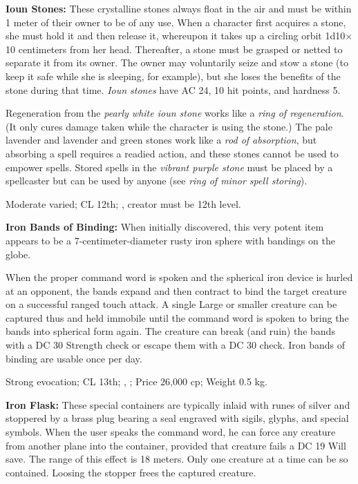 \textbf{Ioun Stones:} These crystalline stones always float in the air and must be within 1 meter of their owner to be of any use. When a character first acquires a stone, she must hold it and then release it, whereupon it takes up a circling orbit 1d10$\times$ 10 centimeters from her head. Thereafter, a stone must be grasped or netted to separate it from its owner. The owner may voluntarily seize and stow a stone (to keep it safe while she is sleeping, for example), but she loses the benefits of the stone during that time. \emph{Ioun stones} have AC 24, 10 hit points, and hardness 5.

Regeneration from the \emph{pearly white ioun stone} works like a \emph{ring of regeneration}. (It only cures damage taken while the character is using the stone.) The pale lavender and lavender and green stones work like a \emph{rod of absorption}, but absorbing a spell requires a readied action, and these stones cannot be used to empower spells. Stored spells in the \emph{vibrant purple stone} must be placed by a spellcaster but can be used by anyone (see \emph{ring of minor spell storing}).

Moderate varied; CL 12th; , creator must be 12th level.



\textbf{Iron Bands of Binding:} When initially discovered, this very potent item appears to be a 7-centimeter-diameter rusty iron sphere with bandings on the globe.

When the proper command word is spoken and the spherical iron device is hurled at an opponent, the bands expand and then contract to bind the target creature on a successful ranged touch attack. A single Large or smaller creature can be captured thus and held immobile until the command word is spoken to bring the bands into spherical form again. The creature can break (and ruin) the bands with a DC 30 Strength check or escape them with a DC 30  check. Iron bands of binding are usable once per day.

Strong evocation; CL 13th; , ; Price 26,000 cp; Weight 0.5 kg.



\textbf{Iron Flask:} These special containers are typically inlaid with runes of silver and stoppered by a brass plug bearing a seal engraved with sigils, glyphs, and special symbols. When the user speaks the command word, he can force any creature from another plane into the container, provided that creature fails a DC 19 Will save. The range of this effect is 18 meters. Only one creature at a time can be so contained. Loosing the stopper frees the captured creature.

